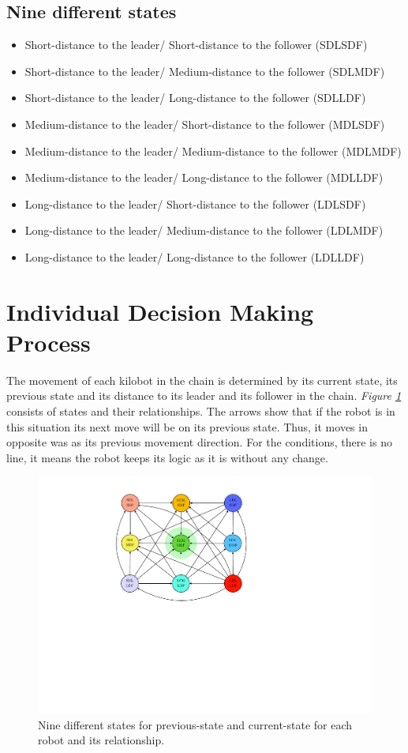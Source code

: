 \documentclass[11pt,a4paper]{article}
\begin{document}
\subsection{Nine different states}
\begin{itemize}
    \item Short-distance to the leader/ Short-distance to the follower (SDLSDF)   
    \item Short-distance to the leader/ Medium-distance to the follower (SDLMDF)
    \item Short-distance to the leader/ Long-distance to the follower (SDLLDF)   
    \item Medium-distance to the leader/ Short-distance to the follower  (MDLSDF) 
    \item Medium-distance to the leader/ Medium-distance to the follower  (MDLMDF) 
    \item Medium-distance to the leader/ Long-distance to the follower (MDLLDF) 
    \item Long-distance to the leader/ Short-distance to the follower (LDLSDF) 
    \item Long-distance to the leader/ Medium-distance to the follower (LDLMDF) 
    \item Long-distance to the leader/ Long-distance to the follower (LDLLDF) 
\end{itemize}
 \section{Individual Decision Making Process }
 The movement of each kilobot in the chain is determined by its current state, its previous state and its distance to its leader and its follower in the chain. \textit{Figure \ref{fig:states}} consists of states and their relationships. The arrows show that if the robot is in this situation its next move will be on its previous state. Thus, it moves in opposite was as its previous movement direction. For the conditions, there is no line, it means the robot keeps its logic as it is without any change. 
 
 \begin{figure}[h]
     \centering
 \includegraphics[scale=0.7]{Figs/States.pdf}
     \caption{Nine different states for previous-state and current-state for each robot and its relationship.  }
     \label{fig:states}
  \end{figure}
 


 
\end{document}
